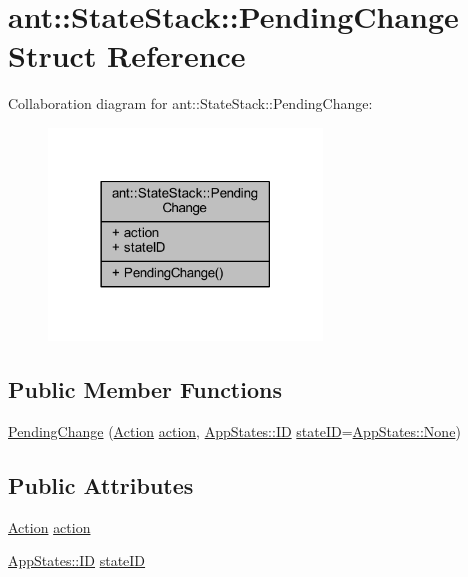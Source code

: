 \hypertarget{structant_1_1_state_stack_1_1_pending_change}{\section{ant\+:\+:State\+Stack\+:\+:Pending\+Change Struct Reference}
\label{structant_1_1_state_stack_1_1_pending_change}
}


Collaboration diagram for ant\+:\+:State\+Stack\+:\+:Pending\+Change\+:
\nopagebreak
\begin{figure}[H]
\begin{center}
\leavevmode
\includegraphics[width=206pt]{d2/dac/structant_1_1_state_stack_1_1_pending_change__coll__graph}
\end{center}
\end{figure}
\subsection*{Public Member Functions}
\begin{DoxyCompactItemize}
\item 
\hyperlink{structant_1_1_state_stack_1_1_pending_change_aa27c02e68001d26a5fe6a21def7b505e}{Pending\+Change} (\hyperlink{classant_1_1_state_stack_a5958413df50ebb647a5bcc5a2d3ee1ce}{Action} \hyperlink{structant_1_1_state_stack_1_1_pending_change_a8bd65a2bdc7313e697c2a3c1dd062901}{action}, \hyperlink{namespaceant_1_1_app_states_a8e30476d77a5da5e0c1c3b9c7042e62a}{App\+States\+::\+I\+D} \hyperlink{structant_1_1_state_stack_1_1_pending_change_ac09fea53d60ca1232aaa3e0f670aae2f}{state\+I\+D}=\hyperlink{namespaceant_1_1_app_states_a8e30476d77a5da5e0c1c3b9c7042e62aa117060da2885bd6f439fad622d3aa637}{App\+States\+::\+None})
\end{DoxyCompactItemize}
\subsection*{Public Attributes}
\begin{DoxyCompactItemize}
\item 
\hyperlink{classant_1_1_state_stack_a5958413df50ebb647a5bcc5a2d3ee1ce}{Action} \hyperlink{structant_1_1_state_stack_1_1_pending_change_a8bd65a2bdc7313e697c2a3c1dd062901}{action}
\item 
\hyperlink{namespaceant_1_1_app_states_a8e30476d77a5da5e0c1c3b9c7042e62a}{App\+States\+::\+I\+D} \hyperlink{structant_1_1_state_stack_1_1_pending_change_ac09fea53d60ca1232aaa3e0f670aae2f}{state\+I\+D}
\end{DoxyCompactItemize}


